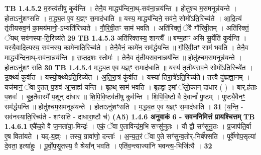 \documentclass[17pt]{extarticle}
\begin{document}
                                \textbf{ TB 1.4.5.2} \newline
                  म॒रुत्व॑तीषु कुर्वन्ति । तेनै॒व माद्ध्य॑न्दिना॒थ्-सव॑ना॒न्नय॑न्ति ॥ होतु॑श्च म॒समनून्न॑यन्ते । होताऽनु॑शꣳसति । म॒द्ध्य॒त ए॒व य॒ज्ञ्ꣳ स॒माद॑धाति ॥ यस्य॒ माद्ध्य॑न्दिने॒ सव॑ने॒ सोमो॑ऽति॒रिच्य॑ते । आ॒दि॒त्यं तृ॑तीयसव॒नं का॒मय॑मानो॒-ऽभ्यति॑रिच्यते । गौ॒रि॒वी॒तꣳ साम॑ भवति । अति॑रिक्तं॒ ॅवै गौ॑रिवी॒तम् । अति॑रिक्तं॒ ॅयथ् सव॑नस्या-ति॒रिच्य॑ते \textbf{ 29} \newline
                  \newline
                                \textbf{ TB 1.4.5.3} \newline
                  अति॑रिक्तस्य॒ शान्त्यै᳚ ॥ बण्म॒हाꣳ अ॑सि सू॒र्येति॑ कुर्वन्ति । यस्यै॒वादि॒त्यस्य॒ सव॑नस्य॒ कामे॑नाति॒रिच्य॑ते । तेनै॒वैनं॒ कामे॑न॒ सम॑र्द्धयन्ति ॥ गौ॒रि॒वी॒तꣳ साम॑ भवति । तेनै॒व माद्ध्य॑न्दिना॒थ्-सव॑ना॒न्नय॑न्ति ॥ स॒प्त॒द॒शः स्तोमः॑ । तेनै॒व तृ॑तीयसव॒नान्नय॑न्ति ॥ होतु॑श्चम॒समनून्न॑यन्ते । होताऽनु॑शꣳ सति \textbf{ 30} \newline
                  \newline
                                \textbf{ TB 1.4.5.4} \newline
                  म॒द्ध्य॒त ए॒व य॒ज्ञ्ꣳ स॒माद॑धाति ॥ यस्य॑ तृतीयसव॒ने सोमो॑ऽति॒रिच्ये॑त । उ॒क्थ्यं॑ कुर्वीत । यस्यो॒क्थ्ये॑ऽति॒रिच्ये॑त । अ॒ति॒रा॒त्रं कु॑र्वीत । यस्या॑-तिरा॒त्रे॑ऽति॒रिच्य॑ते। तत्त्वै दु॑ष्प्रज्ञा॒नम् । यज॑मानं॒ ॅवा ए॒तत् प॒शव॑ आ॒साह्य॑ यन्ति । बृ॒हथ् साम॑ भवति । बृ॒हद्वा इ॒मां ॅलो॒कान् दा॑धार ( ) । बार्.ह॑ताः प॒शवः॑ । बृ॒ह॒तैवास्मै॑ प॒शून् दा॑धार ॥ शि॒पि॒वि॒ष्टव॑तीषु कुर्वन्ति । शि॒पि॒वि॒ष्टो वै दे॒वानां᳚ पु॒ष्टम् । पुष्ट्यै॒वैनꣳ॒॒ सम॑र्द्धयन्ति ॥ होतु॑श्चम॒समनून्न॑यन्ते । होताऽनु॑शꣳसति । म॒द्ध्य॒त ए॒व य॒ज्ञ्ꣳ स॒माद॑धाति । \textbf{ 31} \newline
                  \newline
                                    (य॒न्ति॒ - सव॑नस्याति॒रिच्य॑ते - शꣳसति - दाधारा॒ष्टौ च॑) \textbf{(A5)} \newline \newline
                \textbf{ 1.4.6      अनुवाकं   6 - सवननिमित्तं प्रायश्चित्तम्} \newline
                                \textbf{ TB 1.4.6.1} \newline
                  एकै॑को॒ वै ज॒नता॑या॒-मिन्द्रः॑ । एकं॒ ॅवा ए॒ताविन्द्र॑म॒भि सꣳसु॑नुतः । यौ द्वौ सꣳ॑सुनु॒तः । प्र॒जाप॑ति॒र्वा ए॒ष विता॑यते । यद्-य॒ज्ञ्ः । तस्य॒ ग्रावा॑णो॒ दन्ताः᳚ । अ॒न्य॒त॒रं ॅवा ए॒ते सꣳ॑सुन्व॒तोर्-निर्ब॑फ्सति । पूर्वे॑णोप॒सृत्या॑ दे॒वता॒ इत्या॑हुः । पू॒र्वो॒प॒सृ॒तस्य॒ वै श्रेया᳚न् भवति । एति॑व॒न्त्याज्या॑नि भवन्त्य॒-भिजि॑त्यै । \textbf{ 32} \newline
\end{document}
